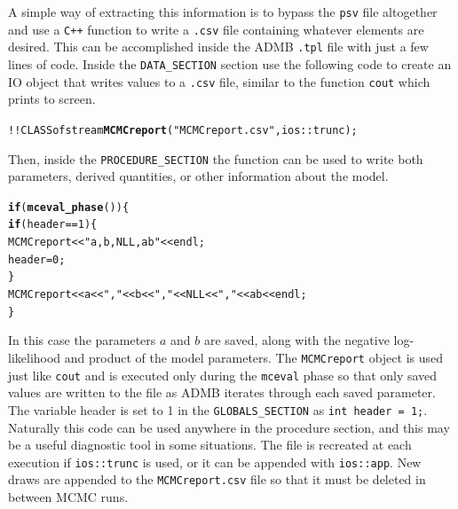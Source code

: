 \documentclass{article}\usepackage[]{graphicx}\usepackage[]{color}
\makeatletter
\newcommand{\hlstr}[1]{\textcolor[rgb]{0.192,0.494,0.8}{#1}}%
\newcommand{\hlkwd}[1]{\textcolor[rgb]{0.737,0.353,0.396}{\textbf{#1}}}%
\newenvironment{kframe}{%
 \def\at@end@of@kframe{}%
 \ifinner\ifhmode%
  \def\at@end@of@kframe{\end{minipage}}%
  \begin{minipage}{\columnwidth}%
 \fi\fi%
 \def\FrameCommand##1{\hskip\@totalleftmargin \hskip-\fboxsep
 \colorbox{shadecolor}{##1}\hskip-\fboxsep
     \hskip-\linewidth \hskip-\@totalleftmargin \hskip\columnwidth}%
 \MakeFramed {\advance\hsize-\width
   \@totalleftmargin\z@ \linewidth\hsize
   \@setminipage}}%
 {\par\unskip\endMakeFramed%
 \at@end@of@kframe}
\newenvironment{knitrout}{}{} %
\makeatother
\begin{document}
A simple way of extracting this information is to bypass the
\texttt{psv} file altogether and use a \texttt{C++} function
to write a \texttt{.csv} file containing whatever elements
are desired. This can be accomplished inside the ADMB
\texttt{.tpl} file with just a few lines of code. Inside the
\texttt{DATA\_SECTION} section use the following code to
create an IO object that writes values to a \texttt{.csv}
file, similar to the function \texttt{cout} which prints to
screen.
\begin{knitrout}
\color{fgcolor}\begin{kframe}
\begin{alltt}
  !!CLASS ofstream \hlkwd{MCMCreport}(\hlstr{"MCMCreport.csv"},ios::trunc);
\end{alltt}
\end{kframe}
\end{knitrout}

Then, inside the \texttt{PROCEDURE\_SECTION} the function
can be used to write both parameters, derived quantities, or
other information about the model.
\begin{knitrout}
\color{fgcolor}\begin{kframe}
\begin{alltt}
  \hlkwd{if}(\hlkwd{mceval_phase}())\{
    \hlkwd{if}(header==1) \{
        MCMCreport << \hlstr{"a,b,NLL,ab"} << endl;
        header=0;
    \}
    MCMCreport << a <<\hlstr{","} << b << \hlstr{","} << NLL << \hlstr{","} << ab << endl;
  \}
\end{alltt}
\end{kframe}
\end{knitrout}


In this case the parameters $a$ and $b$ are saved, along with the negative
log-likelihood and product of the model parameters.  The
\texttt{MCMCreport} object is used just like \texttt{cout} and is executed
only during the \texttt{mceval} phase so that only saved values are written
to the file as ADMB iterates through each saved parameter. The variable
header is set to 1 in the \texttt{GLOBALS\_SECTION} as \texttt{int header =
  1;}. Naturally this code can be used anywhere in the procedure section,
and this may be a useful diagnostic tool in some situations. The file is
recreated at each execution if \texttt{ios::trunc} is used, or it can be
appended with \texttt{ios::app}. New draws are appended to the
\texttt{MCMCreport.csv} file so that it must be deleted in between MCMC
runs.
\end{document}
